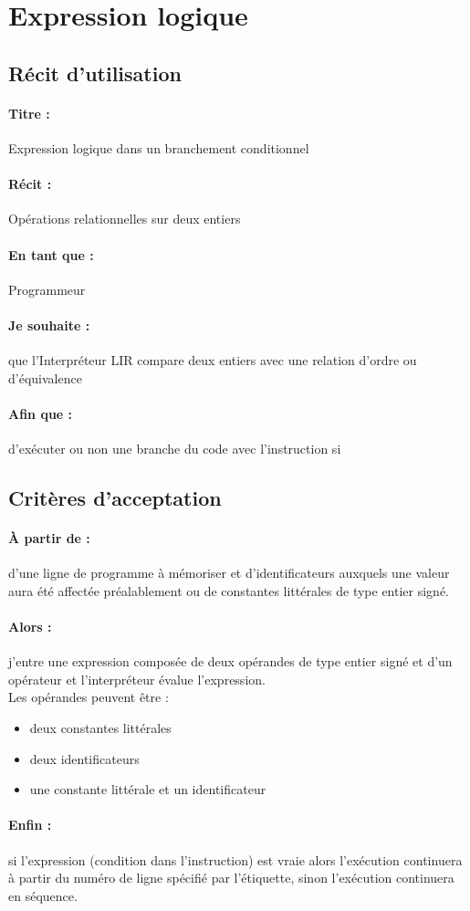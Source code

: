     \section{Expression logique}

    \subsection*{Récit d'utilisation}

    \paragraph{Titre : } Expression logique dans un branchement
    conditionnel
    \paragraph{Récit : } Opérations relationnelles sur deux entiers
    \paragraph{En tant que : } Programmeur
    \paragraph{Je souhaite : } que l'Interpréteur LIR compare deux
    entiers avec une relation d'ordre ou d'équivalence
    \paragraph{Afin que : } d'exécuter ou non une branche du code avec
    l'instruction si

    \subsection*{Critères d'acceptation}

    \paragraph{À partir de : } d'une ligne de programme à mémoriser et d'identificateurs auxquels une valeur aura été affectée préalablement
    ou de constantes littérales de type entier signé.

    \paragraph{Alors : } j'entre une expression composée de deux
    opérandes de type entier signé et d'un opérateur et l'interpréteur
    évalue l'expression.
    \\ Les opérandes peuvent être :
    \begin{itemize}
        \item deux constantes littérales
        \item deux identificateurs
        \item une constante littérale et un identificateur
    \end{itemize}

    \paragraph{Enfin : } si l'expression (condition dans l'instruction)
    est vraie alors l'exécution continuera à partir du numéro de ligne
    spécifié par l’étiquette, sinon l'exécution continuera en séquence.